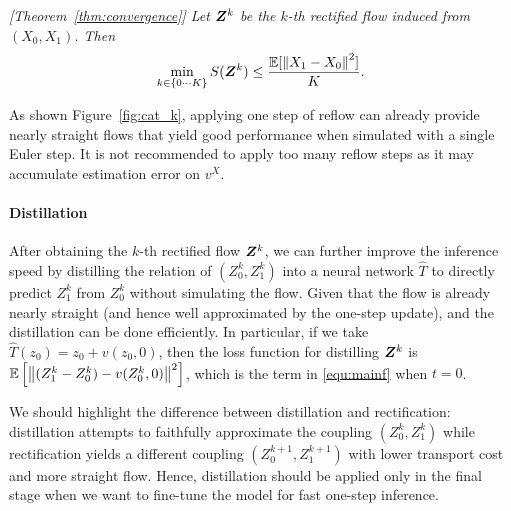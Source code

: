 

\emph{[Theorem~\ref{thm:convergence}] 
Let ${\boldsymbol{Z}}^k $ be the  $k$-th rectified flow %
induced from $(X_0,X_1)$. 
Then %
$$
\min_{k\in\{0\cdots K\}} S({\boldsymbol{Z}}^k) \leq \frac{\mathbb{E}[\left\lVert X_1-X_0\right\rVert^2]}{K}.  
$$
} 






As shown Figure~\ref{fig:cat_k}, 
applying one step of reflow %
can already provide nearly straight flows that yield good performance when simulated with a single Euler step.  
It is not recommended to apply 
too  many reflow steps as it may accumulate  estimation error on $v^X$. 











\paragraph{Distillation} 
After obtaining the $k$-th rectified flow ${\boldsymbol{Z}}^k$, we can further improve the inference speed by distilling the relation of $(Z_0^k, Z_1^k)$ into a neural network $\hat T$ to directly predict  $Z_1^k $ from $Z_0^k$ without simulating the flow. 
Given that the flow is already nearly straight (and hence well approximated by the one-step update), 
and  the distillation can be done efficiently. 
In particular, if we take $\hat T(z_0) = z_0 + v(z_0, 0)$, 
then the loss function for distilling ${\boldsymbol{Z}}^k$ is $\mathbb{E}\left[\left\lVert(Z_1^k - Z_0^k) - v(Z_0^k, 0)\right\rVert^2\right]$, which is the term in \eqref{equ:mainf} when $t =0$.   %

We should highlight the difference between  distillation and  rectification:  %
 distillation attempts to faithfully approximate the coupling $(Z_0^k,Z_1^k)$ 
 while rectification  yields a different coupling $(Z_0^{k+1}, Z_1^{k+1})$ 
 with lower transport cost and more straight flow. 
 Hence, distillation should be applied only in the final stage when we want to fine-tune the model for fast one-step inference. 


